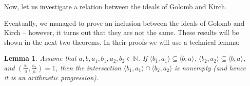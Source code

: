 \documentclass{amsart}
\newtheorem{lem}[thm]{Lemma}
\newtheorem{prop}[thm]{Proposition}
\theoremstyle{definition}
\newcommand{\N}{{\mathbb N}}
\newcommand{\I}{\mathcal I}
\newcommand{\B}{\mathcal{B}}
\newcommand{\SqrFr}{\mathbb{SF}}
\newcommand{\arithseq}[2]{\langle#2, #1\rangle}
\begin{document}
Now, let us investigate a relation between the ideals of Golomb and Kirch.

%
%

Eventually, we managed to prove an inclusion between the ideals of Golomb and Kirch -- however, it turns out that they are not the same. These results will be shown in the next two theorems. In their proofs we will use a technical lemma:
 
\begin{lem} \label{lemCRT}
Assume that $a,b,a_1,b_1,a_2,b_2 \in\N$. If $\arithseq{a_1}{b_1}\subseteq \arithseq{a}{b}$, $\arithseq{a_2}{b_2}\subseteq \arithseq{a}{b}$, and $\left(\frac{a_1}{a},\frac{a_2}{a}\right)=1$, then the intersection $\arithseq{a_1}{b_1}\cap\arithseq{a_2}{b_2}$ is nonempty (and hence it is an arithmetic progression). 
\end{lem}
\end{document}
